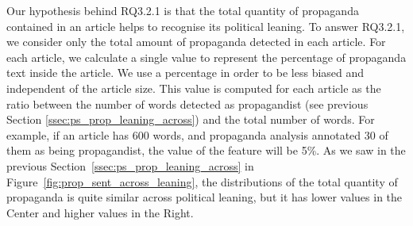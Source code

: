 Our hypothesis behind RQ3.2.1 is that the total quantity of propaganda contained in an article helps to recognise its political leaning.
To answer RQ3.2.1, we
consider only the total amount of propaganda detected in each article. For each article, we calculate a single value to represent the percentage of propaganda text inside the article. %
We use a percentage in order to be less biased and independent of the article size.
This value is computed for each article as the ratio between the number of words detected as propagandist (see previous Section \ref{ssec:ps_prop_leaning_across}) and the total number of words. For example, if an article has 600 words, and propaganda analysis annotated 30 of them as being propagandist, the value of the feature will be 5\%.
As we saw in the previous Section~\ref{ssec:ps_prop_leaning_across} in Figure~\ref{fig:prop_sent_across_leaning}, the distributions of the total quantity of propaganda is quite similar across political leaning, but it has lower values in the Center and higher values in the Right.



